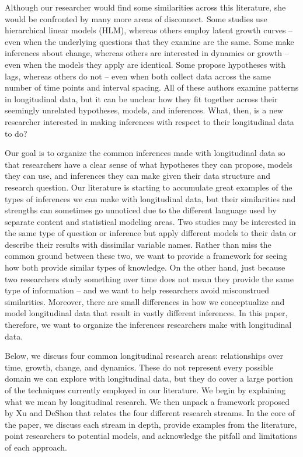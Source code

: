 \documentclass[english,,man]{apa6}
\theoremstyle{definition}
\theoremstyle{definition}
\theoremstyle{definition}
\theoremstyle{remark}
\begin{document}
Although our researcher would find some similarities across this
literature, she would be confronted by many more areas of disconnect.
Some studies use hierarchical linear models (HLM), whereas others employ
latent growth curves -- even when the underlying questions that they
examine are the same. Some make inferences about change, whereas others
are interested in dynamics or growth -- even when the models they apply
are identical. Some propose hypotheses with lags, whereas others do not
-- even when both collect data across the same number of time points and
interval spacing. All of these authors examine patterns in longitudinal
data, but it can be unclear how they fit together across their seemingly
unrelated hypotheses, models, and inferences. What, then, is a new
researcher interested in making inferences with respect to their
longitudinal data to do?

Our goal is to organize the common inferences made with longitudinal
data so that researchers have a clear sense of what hypotheses they can
propose, models they can use, and inferences they can make given their
data structure and research question. Our literature is starting to
accumulate great examples of the types of inferences we can make with
longitudinal data, but their similarities and strengths can sometimes go
unnoticed due to the different language used by separate content and
statistical modeling areas. Two studies may be interested in the same
type of question or inference but apply different models to their data
or describe their results with dissimilar variable names. Rather than
miss the common ground between these two, we want to provide a framework
for seeing how both provide similar types of knowledge. On the other
hand, just because two researchers study something over time does not
mean they provide the same type of information -- and we want to help
researchers avoid misconstrued similarities. Moreover, there are small
differences in how we conceptualize and model longitudinal data that
result in vastly different inferences. In this paper, therefore, we want
to organize the inferences researchers make with longitudinal data.

Below, we discuss four common longitudinal research areas: relationships
over time, growth, change, and dynamics. These do not represent every
possible domain we can explore with longitudinal data, but they do cover
a large portion of the techniques currently employed in our literature.
We begin by explaining what we mean by longitudinal research. We then
unpack a framework proposed by Xu and DeShon that relates the four
different research streams. In the core of the paper, we discuss each
stream in depth, provide examples from the literature, point researchers
to potential models, and acknowledge the pitfall and limitations of each
approach.
\end{document}
